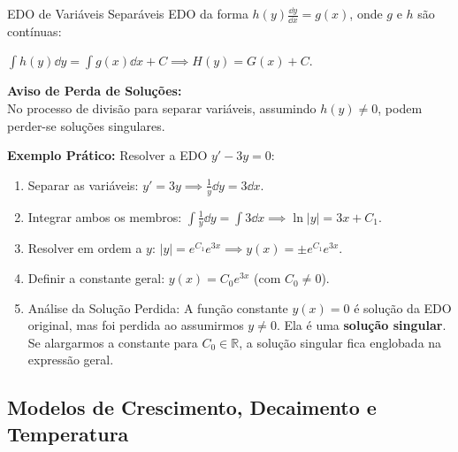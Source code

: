 \documentclass[11pt,a4paper]{article}
\newcommand{\R}{\mathbb{R}}
\newcommand{\dx}{\dd x}
\begin{document}
\noindent\begin{theorembox}{EDO de Variáveis Separáveis}
  EDO da forma $h(y) \frac{\dd y}{\dd x} = g(x)$, onde $g$ e $h$ são contínuas:

  \centerline{$\int h(y) \dd y = \int g(x) \dx + C \implies H(y) = G(x) + C$.}
  
  \vspace {1em}

  \textbf{Aviso de Perda de Soluções:} \\
  No processo de divisão para separar variáveis, assumindo $h(y) \neq 0$, podem perder-se soluções singulares.
  
  \vspace {1em}

  \textbf{Exemplo Prático:} Resolver a EDO $y' - 3y = 0$:
  \begin{enumerate}
    \item Separar as variáveis: $y' = 3y \implies \frac{1}{y} \dd y = 3 \dd x$.
    \item Integrar ambos os membros: $\int \frac{1}{y} \dd y = \int 3 \dd x \implies \ln|y| = 3x + C_1$.
    \item Resolver em ordem a $y$: $|y| = e^{C_1} e^{3x} \implies y(x) = \pm e^{C_1} e^{3x}$.
    \item Definir a constante geral: $y(x) = C_0 e^{3x}$ (com $C_0 \neq 0$).
    \item Análise da Solução Perdida: A função constante $y(x) = 0$ é solução da EDO original, mas foi perdida ao assumirmos $y \neq 0$. Ela é uma \textbf{solução singular}. Se alargarmos a constante para $C_0 \in \R$, a solução singular fica englobada na expressão geral.
  \end{enumerate}
\end{theorembox}

\subsection{Modelos de Crescimento, Decaimento e Temperatura}
\end{document}
